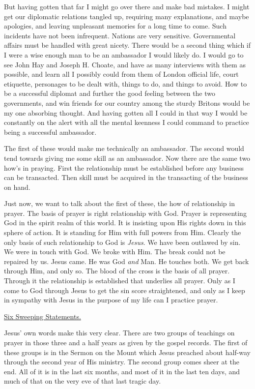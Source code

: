 But having gotten that far I might go over there and make bad mistakes. I
might get our diplomatic relations tangled up, requiring many
explanations, and maybe apologies, and leaving unpleasant memories for a
long time to come. Such incidents have not been infrequent. Nations are
very sensitive. Governmental affairs must be handled with great nicety.
There would be a second thing which if I were a wise enough man to be an
ambassador I would likely do. I would go to see John Hay and Joseph H.
Choate, and have as many interviews with them as possible, and learn all I
possibly could from them of London official life, court etiquette,
personages to be dealt with, things to do, and things to avoid. How to be
a successful diplomat and further the good feeling between the two
governments, and win friends for our country among the sturdy Britons
would be my one absorbing thought. And having gotten all I could in that
way I would be constantly on the alert with all the mental keenness I
could command to practice being a successful ambassador.

The first of these would make me technically an ambassador. The second
would tend towards giving me some skill as an ambassador. Now there are
the same two how's in praying. First the relationship must be established
before any business can be transacted. Then skill must be acquired in the
transacting of the business on hand.

Just now, we want to talk about the first of these, the how of
relationship in prayer. The basis of prayer is right relationship with
God. Prayer is representing God in the spirit realm of this world. It is
insisting upon His rights down in this sphere of action. It is standing
for Him with full powers from Him. Clearly the only basis of such
relationship to God is \textit{Jesus}. We have been outlawed by sin. We were in
touch with God. We broke with Him. The break could not be repaired by us.
Jesus came. He was God \textit{and} Man. He touches both. We get back through
Him, and only so. The blood of the cross is the basis of all prayer.
Through it the relationship is established that underlies all prayer. Only
as I come to God through Jesus to get the sin score straightened, and only
as I keep in sympathy with Jesus in the purpose of my life can I practice
prayer.



\underline{Six Sweeping Statements.}


Jesus' own words make this very clear. There are two groups of teachings
on prayer in those three and a half years as given by the gospel records.
The first of these groups is in the Sermon on the Mount which Jesus
preached about half-way through the second year of His ministry. The
second group comes sheer at the end. All of it is in the last six months,
and most of it in the last ten days, and much of that on the very eve of
that last tragic day.

